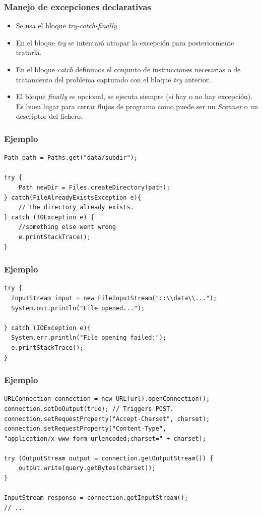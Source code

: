 \documentclass{beamer}
\begin{document}
\begin{frame}[fragile]
\frametitle{Manejo de excepciones declarativas}
\begin{itemize}[<+->]
\item Se usa el bloque \emph{try-catch-finally}
\item En el bloque \emph{try} se intentará atrapar la excepción para posteriormente tratarla.
\item En el bloque \emph{catch} definimos el conjunto de instrucciones necesarias o de tratamiento del problema capturado con el bloque \emph{try} anterior.
\item El bloque \emph{finally} es opcional, se ejecuta siempre (si hay o no hay excepción). Es buen lugar para cerrar flujos de programa como puede ser un \emph{Scenner} o un descriptor del fichero.
\end{itemize} 
\end{frame}

\begin{frame}[fragile]
\frametitle{Ejemplo}
\begin{verbatim}
Path path = Paths.get("data/subdir");

try {
    Path newDir = Files.createDirectory(path);
} catch(FileAlreadyExistsException e){
    // the directory already exists.
} catch (IOException e) {
    //something else went wrong
    e.printStackTrace();
}
\end{verbatim}
\end{frame}

\begin{frame}[fragile]
\frametitle{Ejemplo}
\begin{verbatim}
try {
  InputStream input = new FileInputStream("c:\\data\\...");
  System.out.println("File opened...");

} catch (IOException e){
  System.err.println("File opening failed:");
  e.printStackTrace();
}
\end{verbatim}
\end{frame}

\begin{frame}[fragile]
\frametitle{Ejemplo}
\begin{verbatim}
URLConnection connection = new URL(url).openConnection();
connection.setDoOutput(true); // Triggers POST.
connection.setRequestProperty("Accept-Charset", charset);
connection.setRequestProperty("Content-Type", 
"application/x-www-form-urlencoded;charset=" + charset);

try (OutputStream output = connection.getOutputStream()) {
    output.write(query.getBytes(charset));
}

InputStream response = connection.getInputStream();
// ...
\end{verbatim}
\end{frame}
\end{document}
